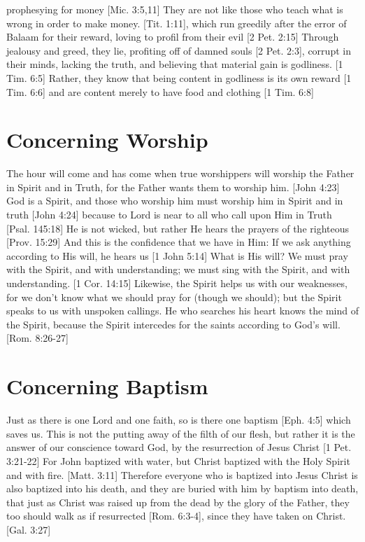 \documentclass[../main.tex]{subfiles}
\begin{document}
prophesying for money [Mic. 3:5,11] They are not like those who teach what is wrong in order to make money. [Tit. 1:11], which run greedily after the error of Balaam for their reward, loving to profil from their evil [2 Pet. 2:15] Through jealousy and greed, they lie, profiting off of damned souls [2 Pet. 2:3], corrupt in their minds, lacking the truth, and believing that material gain is godliness. [1 Tim. 6:5] Rather, they know that being content in godliness is its own reward [1 Tim. 6:6] and are content merely to have food and clothing [1 Tim. 6:8]

	\section{Concerning Worship}

	The hour will come and has come when true worshippers will worship the Father in Spirit and in Truth, for the Father wants them to worship him. [John 4:23] God is a Spirit, and those who worship him must worship him in Spirit and in truth [John 4:24] because to Lord is near to all who call upon Him in Truth [Psal. 145:18] He is not wicked, but rather He hears the prayers of the righteous [Prov. 15:29] And this is the confidence that we have in Him: If we ask anything according to His will, he hears us [1 John 5:14] What is His will?  We must pray with the Spirit, and with understanding; we must sing with the Spirit, and with understanding. [1 Cor. 14:15] Likewise, the Spirit helps us with our weaknesses, for we don't know what we should pray for (though we should); but the Spirit speaks to us with unspoken callings. He who searches his heart knows the mind of the Spirit, because the Spirit intercedes for the saints according to God's will. [Rom. 8:26-27]

	\section{Concerning Baptism}

	Just as there is one Lord and one faith, so is there one baptism [Eph. 4:5] which saves us. This is not the putting away of the filth of our flesh, but rather it is the answer of our conscience toward God, by the resurrection of Jesus Christ [1 Pet. 3:21-22] For John baptized with water, but Christ baptized with the Holy Spirit and with fire. [Matt. 3:11] Therefore everyone who is baptized into Jesus Christ is also baptized into his death, and they are buried with him by baptism into death, that just as Christ was raised up from the dead by the glory of the Father, they too should walk as if resurrected [Rom. 6:3-4], since they have taken on Christ. [Gal. 3:27]
\end{document}
